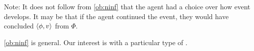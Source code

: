 \begin{note}
  Note:
  It does not follow from \autoref{ob:ninf} that the agent had a choice over how event develops.
  It may be that if the agent continued the event, they would have concluded \(\langle \phi, v \rangle\) from \(\Phi\).
\end{note}

\begin{note}
  \autoref{ob:ninf} is general.
  Our interest is with a particular type of \ninf{}.
\end{note}





\section{}
\label{cha:requs:sec:definition}


